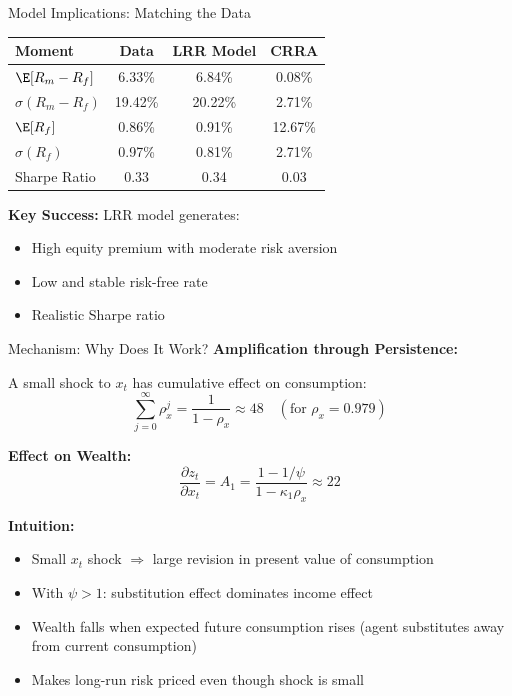 \documentclass{beamer}
\begin{document}
\begin{frame}{Model Implications: Matching the Data}
    \begin{table}[h]
    \centering
    \small
    \begin{tabular}{lccc}
    \toprule
    \textbf{Moment} & \textbf{Data} & \textbf{LRR Model} & \textbf{CRRA} \\
    \midrule
    $\E[R_m - R_f]$ & 6.33\% & 6.84\% & 0.08\% \\
    $\sigma(R_m - R_f)$ & 19.42\% & 20.22\% & 2.71\% \\
    $\E[R_f]$ & 0.86\% & 0.91\% & 12.67\% \\
    $\sigma(R_f)$ & 0.97\% & 0.81\% & 2.71\% \\
    Sharpe Ratio & 0.33 & 0.34 & 0.03 \\
    \bottomrule
    \end{tabular}
    \end{table}
    
    \vspace{0.3cm}
    \textbf{Key Success:} LRR model generates:
    \begin{itemize}
        \item High equity premium with moderate risk aversion
        \item Low and stable risk-free rate
        \item Realistic Sharpe ratio
    \end{itemize}
\end{frame}

\begin{frame}{Mechanism: Why Does It Work?}
    \textbf{Amplification through Persistence:}
    
    A small shock to $x_t$ has cumulative effect on consumption:
    \begin{equation}
        \sum_{j=0}^{\infty} \rho_x^j = \frac{1}{1-\rho_x} \approx 48 \quad (\text{for } \rho_x = 0.979)
    \end{equation}
    
    \textbf{Effect on Wealth:}
    \begin{equation}
        \frac{\partial z_t}{\partial x_t} = A_1 = \frac{1-1/\psi}{1-\kappa_1\rho_x} \approx 22
    \end{equation}
    
    \textbf{Intuition:}
    \begin{itemize}
        \item Small $x_t$ shock $\Rightarrow$ large revision in present value of consumption
        \item With $\psi > 1$: substitution effect dominates income effect
        \item Wealth falls when expected future consumption rises (agent substitutes away from current consumption)
        \item Makes long-run risk priced even though shock is small
    \end{itemize}
\end{frame}
\end{document}
